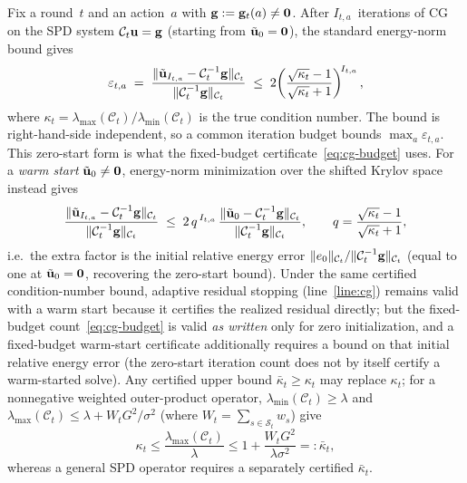 \documentclass[twoside]{article}
\newcommand{\Calg}{\mathcal{C}}                 %
\begin{document}
Fix a round~$t$ and an action~$a$ with $\mathbf{g}:=\mathbf{g}_t(a)\ne\mathbf0$.  After
$I_{t,a}$~iterations of CG on the SPD system $\Calg_t\bu=\bg$ (starting
from $\tilde{\mathbf{u}}_0=\mathbf{0}$), the standard energy-norm bound gives
\[
  \varepsilon_{t,a}
  \;=\;
  \frac{\|\tilde\bu_{I_{t,a}} - \Calg_t^{-1}\bg\|_{\Calg_t}}
       {\|\Calg_t^{-1}\bg\|_{\Calg_t}}
  \;\le\;
  2\!\left(\frac{\sqrt{\kappa_t}-1}{\sqrt{\kappa_t}+1}\right)^{\!I_{t,a}},
\]
where $\kappa_t=\lambda_{\max}(\Calg_t)/\lambda_{\min}(\Calg_t)$
is the true condition number.  The bound is right-hand-side independent, so a
common iteration budget bounds $\max_a\varepsilon_{t,a}$.  This zero-start form is
what the fixed-budget certificate~\eqref{eq:cg-budget} uses.
For a \emph{warm start} $\tilde{\mathbf{u}}_0\ne\mathbf0$, energy-norm minimization over the
shifted Krylov space instead gives
\[
  \frac{\|\tilde\bu_{I_{t,a}}-\Calg_t^{-1}\bg\|_{\Calg_t}}{\|\Calg_t^{-1}\bg\|_{\Calg_t}}
  \;\le\;
  2\,q^{\,I_{t,a}}\,
  \frac{\|\tilde\bu_0-\Calg_t^{-1}\bg\|_{\Calg_t}}{\|\Calg_t^{-1}\bg\|_{\Calg_t}},
  \qquad q=\frac{\sqrt{\kappa_t}-1}{\sqrt{\kappa_t}+1},
\]
i.e.\ the extra factor is the initial relative energy error $\|e_0\|_{\Calg_t}/
\|\Calg_t^{-1}\bg\|_{\Calg_t}$ (equal to one at $\tilde{\mathbf{u}}_0=\mathbf0$, recovering the
  zero-start bound).  Under the same certified condition-number bound, adaptive
residual stopping (line~\ref{line:cg}) remains valid with a warm start because it
certifies the realized residual directly; but the fixed-budget
count~\eqref{eq:cg-budget} is valid \emph{as written} only for zero initialization,
and a fixed-budget warm-start certificate additionally requires a bound on that
initial relative energy error (the zero-start iteration count does not by itself
certify a warm-started solve).
Any certified upper bound $\bar\kappa_t\ge\kappa_t$ may replace $\kappa_t$; for a
nonnegative weighted outer-product operator,
$\lambda_{\min}(\Calg_t)\ge\lambda$ and
$\lambda_{\max}(\Calg_t)\le\lambda+W_tG^2/\sigma^2$
(where $W_t=\sum_{s\in\mathcal{S}_t}w_s$) give
\[
\kappa_t\le\frac{\lambda_{\max}(\Calg_t)}{\lambda}
\le1+\frac{W_tG^2}{\lambda\sigma^2}=: \bar\kappa_t,
\]
whereas a general SPD operator
requires a separately certified $\bar\kappa_t$.
\end{document}
